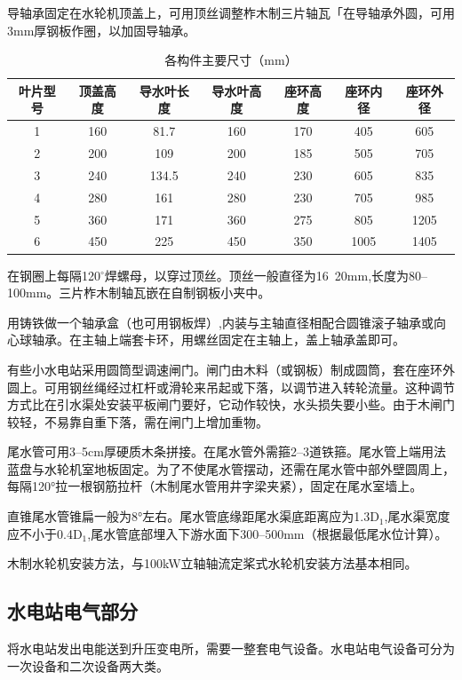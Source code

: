 \documentclass{ctexbook}
\begin{document}
导轴承固定在水轮机顶盖上，可用顶丝调整柞木制三片轴瓦「在导轴承外圆，可用3mm厚钢板作圈，以加固导轴承。
\begin{table}[htbp]
	\centering
	\caption{各构件主要尺寸（mm）}
	\begin{tabular}{c|c|c|c|c|c|c}
		\hline
		叶片型号 & 顶盖高度 & 导水叶长度 & 导水叶高度 & 座环高度  & 座环内径  & 座环外径 \\ \hline
		1     & 160   & 81.7  & 160   & 170   & 405   & 605 \\ \hline
		2     & 200   & 109   & 200   & 185   & 505   & 705 \\ \hline
		3     & 240   & 134.5 & 240   & 230   & 605   & 835 \\ \hline
		4     & 280   & 161   & 280   & 230   & 705   & 985 \\ \hline
		5     & 360   & 171   & 360   & 275   & 805   & 1205 \\ \hline
		6     & 450   & 225   & 450   & 350   & 1005  & 1405 \\ \hline
	\end{tabular}%
	\label{tab:addlabel}%
\end{table}%


在钢圈上每隔120$^\circ$焊螺母，以穿过顶丝。顶丝一般直径为16~20mm,长度为80--100mm。三片柞木制轴瓦嵌在自制钢板小夹中。

用铸铁做一个轴承盒（也可用钢板焊）,内装与主轴直径相配合圆锥滚子轴承或向心球轴承。在主轴上端套卡环，用螺丝固定在主轴上，盖上轴承盖即可。

有些小水电站采用圆筒型调速闸门。闸门由木料（或钢板）制成圆筒，套在座环外圆上。可用钢丝绳经过杠杆或滑轮来吊起或下落，以调节进入转轮流量。这种调节方式比在引水渠处安装平板闸门要好，它动作较快，水头损失要小些。由于木闸门较轻，不易靠自重下落，需在闸门上增加重物。

尾水管可用3--5cm厚硬质木条拼接。在尾水管外需箍2--3道铁箍。尾水管上端用法蓝盘与水轮机室地板固定。为了不使尾水管摆动，还需在尾水管中部外壁圆周上，每隔120°拉一根钢筋拉杆（木制尾水管用井字梁夹紧），固定在尾水室墙上。

直锥尾水管锥扁一般为8°左右。尾水管底缘距尾水渠底距离应为1.3D$_1$,尾水渠宽度应不小于0.4D$_1$,尾水管底部埋入下游水面下300--500mm（根据最低尾水位计算）。

木制水轮机安装方法，与100kW立轴轴流定桨式水轮机安装方法基本相同。
\subsection{水电站电气部分}
将水电站发出电能送到升压变电所，需要一整套电气设备。水电站电气设备可分为一次设备和二次设备两大类。
\end{document}
